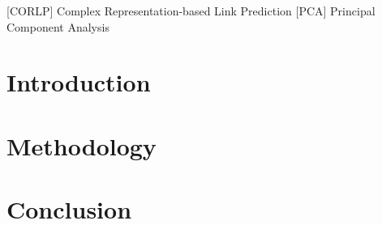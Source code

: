 \documentclass{article}
\begin{document}
\begin{acronym}
    [CORLP]     {Complex Representation-based Link Prediction}
    [PCA]     {Principal Component Analysis}
\end{acronym}


\clearpage

\tableofcontents
\clearpage

\section{Introduction}


\section{Methodology}


\section{Conclusion}


\clearpage


\end{document}
